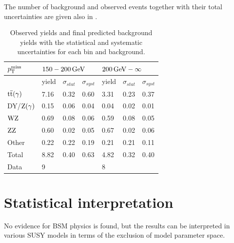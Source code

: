 The number of background and observed events together with their total uncertainties are given also in .
\begin{table}[bpt]
 \centering
 \caption{Observed yields and final predicted background yields with the statistical and systematic uncertainties for each bin and background.}
 \normalsize
 \label{tab:results}
 \begin{tabular}{lllllll}
  $p_{\mathrm{T}}^\text{miss}$      & \multicolumn{3}{l}{$150-200\,\text{Ge\hspace{-.08em}V}$} & \multicolumn{3}{l}{$200\,\text{Ge\hspace{-.08em}V}-\infty$}                                                               \\\hline
                 & yield                             & $\sigma_{stat}$                      & $\sigma_{syst}$ & yield & $\sigma_{stat}$ & $\sigma_{syst}$ \\\hline
  ${\mathrm{t}\overline{\mathrm{t}}}(\gamma)$ & 7.16                              & 0.32                                 & 0.60            & 3.31  & 0.23            & 0.37            \\
  DY/$\mathrm{Z}(\gamma)$ & 0.15                              & 0.06                                 & 0.04            & 0.04  & 0.02            & 0.01            \\
  $\mathrm{W}\mathrm{Z}$       & 0.69                              & 0.08                                 & 0.06            & 0.59  & 0.08            & 0.05            \\
  $\mathrm{Z}\mathrm{Z}$       & 0.60                              & 0.02                                 & 0.05            & 0.67  & 0.02            & 0.06            \\
  Other          & 0.22                              & 0.22                                 & 0.19            & 0.21  & 0.21            & 0.11            \\\hline
  Total          & 8.82                              & 0.40                                 & 0.63            & 4.82  & 0.32            & 0.40            \\\hline
  Data           & 9                                 &                                      &                 & 8     &                 &                 \\\hline
 \end{tabular}
 \vspace{\baselineskip}
\end{table}


\section{Statistical interpretation}
No evidence for BSM physics is found, but the results can be interpreted in various SUSY models in terms of the exclusion of model parameter space.
